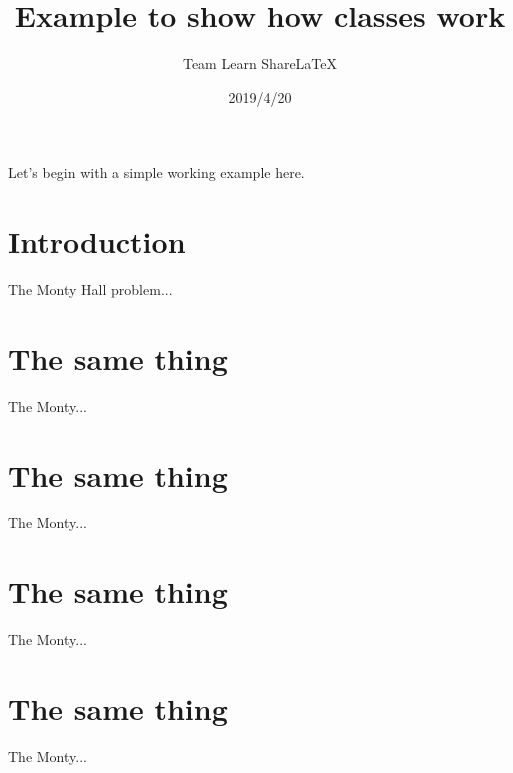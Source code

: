\documentclass[red]{mytest}
\title{Example to show how classes work}
\author{Team Learn ShareLaTeX}
\date{2019/4/20}
\begin{document}
\maketitle
\noindent
Let's begin with a simple working example here.
\blindtext
\section{Introduction}
The Monty Hall problem...
\blindtext
\section{The same thing}
The Monty...
\blindtext
\section{The same thing}
The Monty...
\blindtext

\section{The same thing}
The Monty...
\blindtext

\section{The same thing}
The Monty...
\blindtext
\end{document}
